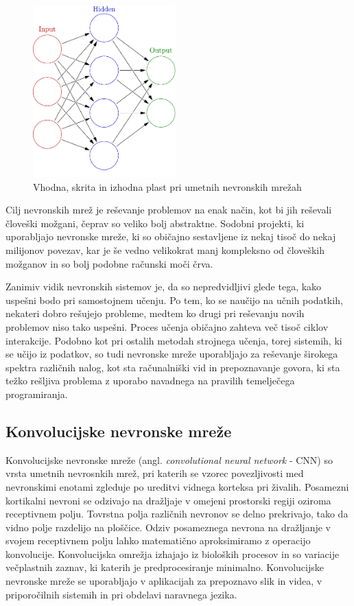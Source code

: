 \documentclass[runningheads,a4paper]{llncs}
\begin{document}
\begin{figure}[H]
\centering
\includegraphics[width=55mm]{figures/Colored_neural_network.pdf}
\caption{Vhodna, skrita in izhodna plast pri umetnih nevronskih mrežah}
\label{fig:layersANN}
\end{figure}

Cilj nevronskih mrež je reševanje problemov na enak način, kot bi jih reševali človeški možgani, čeprav so veliko bolj abstraktne. Sodobni projekti, ki uporabljajo nevronske mreže, ki so običajno sestavljene iz nekaj tisoč do nekaj milijonov povezav, kar je še vedno velikokrat manj kompleksno od človeških možganov in so bolj podobne računski moči črva.

Zanimiv vidik nevronskih sistemov je, da so nepredvidljivi glede tega, kako uspešni bodo pri samostojnem učenju. Po tem, ko se naučijo na učnih podatkih, nekateri dobro rešujejo probleme, medtem ko drugi pri reševanju novih problemov niso tako uspešni. Proces učenja običajno zahteva več tisoč ciklov interakcije. Podobno kot pri ostalih metodah strojnega učenja, torej sistemih, ki se učijo iz podatkov, so tudi nevronske mreže uporabljajo za reševanje širokega spektra različnih nalog, kot sta računalniški vid in prepoznavanje govora, ki sta težko rešljiva problema z uporabo navadnega na pravilih temelječega programiranja.

\subsection{Konvolucijske nevronske mreže}

Konvolucijske nevronske mreže (angl. \textit{convolutional neural network} - CNN) so vrsta umetnih nevrosnkih mrež, pri katerih se vzorec povezljivosti med nevronskimi enotami zgleduje po ureditvi vidnega korteksa pri živalih\cite{wiki:CNN}. Posamezni kortikalni nevroni se odzivajo na dražljaje v omejeni prostorski regiji oziroma receptivnem polju. Tovrstna polja različnih nevronov se delno prekrivajo, tako da vidno polje razdelijo na ploščice. Odziv posameznega nevrona na dražljanje v svojem receptivnem polju lahko matematično aproksimiramo z operacijo konvolucije. Konvolucijska omrežja izhajajo iz bioloških procesov in so variacije večplastnih zaznav, ki katerih je predprocesiranje minimalno. Konvolucijske nevronske mreže se uporabljajo v aplikacijah za prepoznavo slik in videa, v priporočilnih sistemih in pri obdelavi naravnega jezika.
\end{document}
